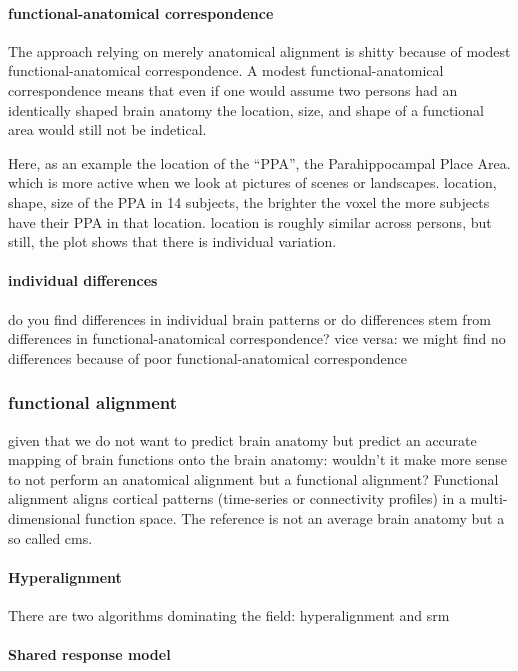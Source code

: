 \paragraph{functional-anatomical correspondence}
The approach relying on merely anatomical alignment is shitty because of modest
functional-anatomical correspondence.
A modest functional-anatomical correspondence means that even if one would assume
two persons had an identically shaped brain anatomy the location, size, and
shape of a functional area would still not be indetical.

Here, as an example the location of the ``PPA'', the Parahippocampal Place Area.
which is more active when we look at pictures of scenes or landscapes.
%
location, shape, size of the PPA in 14 subjects,
%
the brighter the voxel the more subjects have their PPA in that location.
%
location is roughly similar across persons, but still, the plot shows that there
is individual variation.


\paragraph{individual differences}
%
do you find differences in individual brain patterns or do differences stem from
differences in functional-anatomical correspondence?
%
vice versa: we might find no differences because of poor functional-anatomical
correspondence


\subsubsection{functional alignment}
%
given that we do not want to predict brain anatomy but predict an accurate
mapping of brain functions onto the brain anatomy:
%
wouldn't it make more sense to not perform an anatomical alignment but a
functional alignment?
%
Functional alignment aligns cortical patterns (time-series or connectivity
profiles) in a multi-dimensional function space.
The reference is not an average brain anatomy but a so called \ac{cms}.


\paragraph{Hyperalignment}
%
There are two algorithms dominating the field: hyperalignment and \ac{srm}


\paragraph{Shared response model}
%


